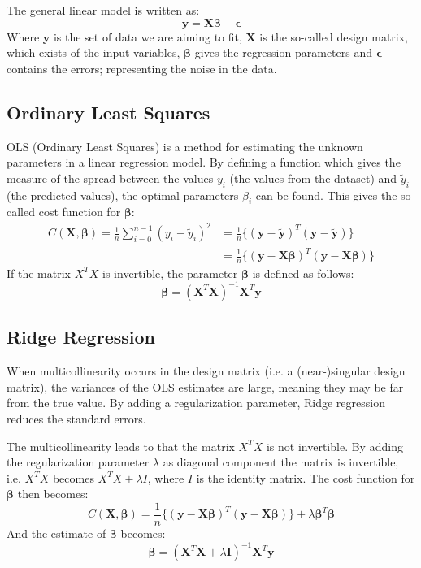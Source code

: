 \documentclass[12pt]{extarticle}
\begin{document}
The general linear model is written as:
\begin{equation*}
    \bm{y} = \bm{X} \bm{\beta} + \bm{\epsilon}
\end{equation*}
Where $\bm{y}$ is the set of data we are aiming to fit, $\bm{X}$ is the so-called design matrix, which exists of the input variables, $\bm{\beta}$ gives the regression parameters and $\bm{\epsilon}$ contains the errors; representing the noise in the data. 

\subsection{Ordinary Least Squares}

OLS (Ordinary Least Squares) is a method for estimating the unknown parameters in a linear regression model. By defining a function which gives the measure of the spread between the values $y_i$ (the values from the dataset) and $\tilde{y}_i$ (the predicted values), the optimal parameters $\beta_i$ can be found.  This gives the so-called cost function for $\bm{\beta}$:
\begin{equation*}
\begin{aligned}
    C(\bm{X}, \bm{\beta}) = \frac{1}{n} \sum_{i=0}^{n-1} (y_i - \tilde{y}_i)^2 &= \frac{1}{n} \Big\{(\bm{y} - \bm{\tilde{y}})^T(\bm{y} - \bm{\tilde{y}})\Big\} \\
    &= \frac{1}{n} \Big\{(\bm{y} - \bm{X}\bm{\beta})^T(\bm{y} - \bm{X}\bm{\beta})\Big\}
\end{aligned}
\end{equation*}
If the matrix $X^TX$ is invertible, the parameter $\bm{\beta}$ is defined as follows: 
\begin{equation*}
    \bm{\beta} = (\bm{X}^T\bm{X})^{-1} \bm{X}^T \bm{y}
\end{equation*}

\subsection{Ridge Regression}

When multicollinearity occurs in the design matrix (i.e. a (near-)singular design matrix), the variances of the OLS estimates are large, meaning they may be far from the true value. By adding a regularization parameter, Ridge regression reduces the standard errors. \cite{ncss}

The multicollinearity leads to that the matrix $X^TX$ is not invertible. By adding the regularization parameter $\lambda$ as diagonal component the matrix is invertible, i.e. $X^TX$ becomes $X^TX + \lambda I$, where $I$ is the identity matrix. The cost function for $\bm{\beta}$ then becomes:
\begin{equation*}
    C(\bm{X}, \bm{\beta}) = \frac{1}{n} \Big\{(\bm{y} - \bm{X}\bm{\beta})^T(\bm{y} - \bm{X}\bm{\beta})\Big\} + \lambda \bm{\beta}^T \bm{\beta}
\end{equation*}
And the estimate of $\bm{\beta}$ becomes: 
\begin{equation*}
    \bm{\beta} = (\bm{X}^T\bm{X} + \lambda \bm{I})^{-1} \bm{X}^T \bm{y}
\end{equation*}
\end{document}
